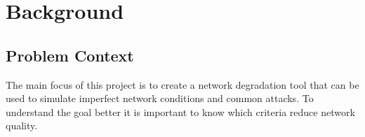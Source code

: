


\chapter{Background}

\section{Problem Context}

The main focus of this project is to create a network degradation tool that can be used to simulate imperfect network conditions and common attacks. To understand the goal better it is important to know which criteria reduce network quality.

